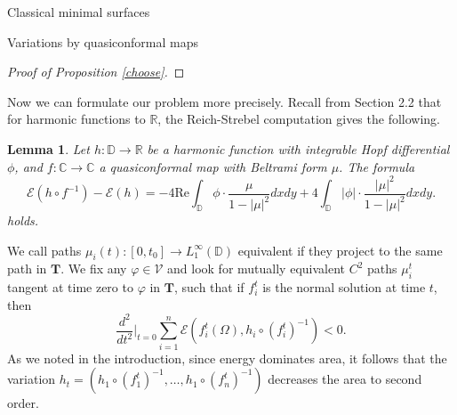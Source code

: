 \documentclass[10pt]{amsart}
\newcommand{\R}{\mathbb R}
\newtheorem{lem}[thm]{Lemma}
\theoremstyle{definition}
\begin{document}
\begin{section}{Classical minimal surfaces}
\begin{subsection}{Variations by quasiconformal maps}
\begin{proof}[Proof of Proposition \ref{choose}]
\end{proof}
 Now we can formulate our problem more precisely. Recall from Section 2.2 that for harmonic functions to $\R$, the Reich-Strebel computation gives the following.
\begin{lem}\label{RSr3}
Let $h: \mathbb{D}\to\mathbb{R}$ be a harmonic function with integrable Hopf differential $\phi$, and $f:\mathbb{C}\to\mathbb{C}$ a quasiconformal map with Beltrami form $\mu$. The formula
\begin{equation}\label{RSforr3}
    \mathcal{E}(h\circ f^{-1}) -\mathcal{E}(h) =  -4\textrm{Re} \int_{\mathbb{D}} \phi\cdot \frac{ \mu}{1-|\mu|^2}dxdy + 4\int_{\mathbb{D}} |\phi|\cdot \frac{|\mu|^2}{1-|\mu|^2}dxdy.
\end{equation}
holds.
\end{lem}
 We call paths $\mu_i(t): [0,t_0]\to L_1^\infty(\mathbb{D})$ equivalent if they project to the same path in $\mathbf{T}$. We fix any $\varphi\in \mathcal{V}$ and look for mutually equivalent $C^2$ paths $\mu_i^t$ tangent at time zero to $\varphi$ in $\mathbf{T}$, such that if $f_i^t$ is the normal solution at time $t$, then $$\frac{d^2}{dt^2}|_{t=0}\sum_{i=1}^n\mathcal{E}(f_i^t(\Omega),h_i\circ (f_i^t)^{-1})<0.$$ As we noted in the introduction, since energy dominates area, it follows that the variation $h_t=(h_1\circ (f_1^t)^{-1},\dots, h_1\circ (f_n^t)^{-1})$ decreases the area to second order.
\end{subsection}



\end{section}
\end{document}
